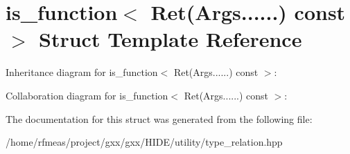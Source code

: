 \hypertarget{structis__function_3_01Ret_07Args_8_8_8_8_8_8_08_01const_01_01_4}{}\section{is\+\_\+function$<$ Ret(Args......) const $>$ Struct Template Reference}
\label{structis__function_3_01Ret_07Args_8_8_8_8_8_8_08_01const_01_01_4}


Inheritance diagram for is\+\_\+function$<$ Ret(Args......) const $>$\+:


Collaboration diagram for is\+\_\+function$<$ Ret(Args......) const $>$\+:


The documentation for this struct was generated from the following file\+:\begin{DoxyCompactItemize}
\item 
/home/rfmeas/project/gxx/gxx/\+H\+I\+D\+E/utility/type\+\_\+relation.\+hpp\end{DoxyCompactItemize}
